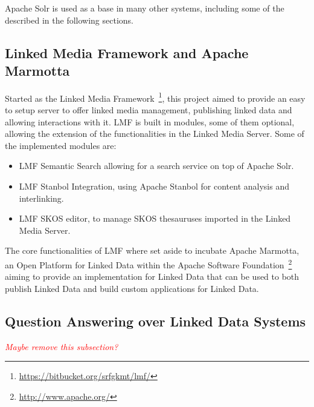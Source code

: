Apache Solr is used as a base in many other systems, including some of the described in the following sections.


\subsection{Linked Media Framework and Apache Marmotta}

Started as the Linked Media Framework~\footnote{\url{https://bitbucket.org/srfgkmt/lmf/}}, this project aimed to provide an easy to setup server to offer linked media management, publishing linked data and allowing interactions with it. \ac{LMF} is built in modules, some of them optional, allowing the extension of the functionalities in the Linked Media Server. Some of the implemented modules are:

\begin{itemize}[topsep=0pt,itemsep=-1ex,partopsep=1ex,parsep=1ex]
  \item \ac{LMF} Semantic Search allowing for a search service on top of Apache Solr. 
  \item \ac{LMF} Stanbol Integration, using Apache Stanbol for content analysis and interlinking.
  \item \ac{LMF} SKOS editor, to manage SKOS thesauruses imported in the Linked Media Server.
\end{itemize}

The core functionalities of \ac{LMF} where set aside to incubate Apache Marmotta, an Open Platform for Linked Data within the Apache Software Foundation~\footnote{\url{http://www.apache.org/}} aiming to provide an implementation for Linked Data that can be used to both publish Linked Data and build custom applications for Linked Data.



\subsection{Question Answering over Linked Data Systems}
\label{subsec:qa_linked}

\emph{\textcolor{red}{Maybe remove this subsection?}}


